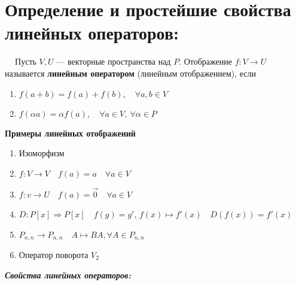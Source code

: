 \documentclass[a4paper, 12pt]{report}
\begin{document}
	
	
	
	
	\section{Определение и простейшие свойства линейных операторов:}
	$\quad\ $Пусть $V,U$ --- векторные пространства над $P$. Отображение $f : V \rightarrow U$ называется \textbf{линейным оператором} (линейным отображением), если
	
	\begin{enumerate}
		\item $f(a+b) = f(a) + f(b),\quad \forall a,b \in V$
		\item $f(\alpha a) = \alpha f(a), \quad \forall a\in V,\  \forall \alpha \in P$
	\end{enumerate}
	
	\textbf{Примеры линейных отображений}
	
	\begin{enumerate}
		\item Изоморфизм
		\item $f : V\rightarrow V\quad f(a) = a \quad \forall a\in V$
		\item $f:v\rightarrow U\quad f(a) = \overrightarrow{0}\quad\forall a\in V$
		\item $D: P[x] \Rightarrow P[x]\quad f(g) = g'$, $f(x) \mapsto f'(x)\quad D(f(x)) = f'(x)$
		\item $P_{n,n} \rightarrow P_{n,n}\quad A\mapsto BA, \forall A\in P_{n,n}$
		\item Оператор поворота $V_2$
	\end{enumerate}
	
	\textbf{\textit{Свойства линейных операторов:}}
	
\end{document}
